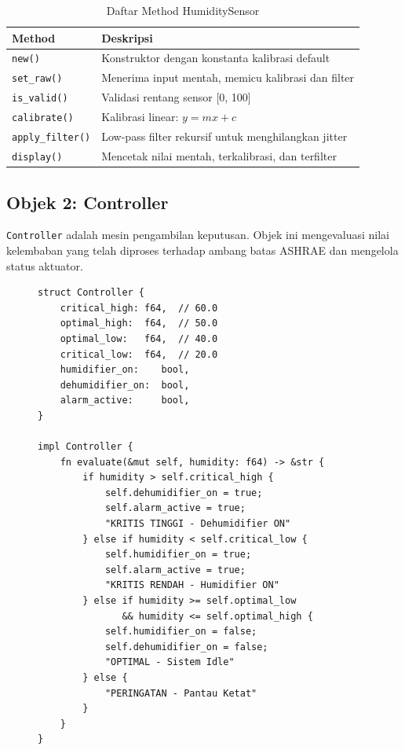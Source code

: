 \documentclass[journal]{IEEEtran}
\begin{document}
\begin{table}[H]
  \centering
  \caption{Daftar Method HumiditySensor}
  \begin{tabular}{@{}ll@{}}
    \toprule
    \textbf{Method} & \textbf{Deskripsi} \\
    \midrule
    \texttt{new()}           & Konstruktor dengan konstanta kalibrasi default \\
    \texttt{set\_raw()}      & Menerima input mentah, memicu kalibrasi dan filter \\
    \texttt{is\_valid()}     & Validasi rentang sensor [0, 100] \\
    \texttt{calibrate()}     & Kalibrasi linear: $y = mx + c$ \\
    \texttt{apply\_filter()} & Low-pass filter rekursif untuk menghilangkan jitter \\
    \texttt{display()}       & Mencetak nilai mentah, terkalibrasi, dan terfilter \\
    \bottomrule
  \end{tabular}
\end{table}

\subsection{Objek 2: Controller}
\texttt{Controller} adalah mesin pengambilan keputusan. Objek ini mengevaluasi nilai kelembaban yang telah diproses terhadap ambang batas ASHRAE dan mengelola status aktuator.

\begin{figure}[H]
\begin{lstlisting}[caption={Struct Controller dan Method Evaluate}]
struct Controller {
    critical_high: f64,  // 60.0
    optimal_high:  f64,  // 50.0
    optimal_low:   f64,  // 40.0
    critical_low:  f64,  // 20.0
    humidifier_on:    bool,
    dehumidifier_on:  bool,
    alarm_active:     bool,
}

impl Controller {
    fn evaluate(&mut self, humidity: f64) -> &str {
        if humidity > self.critical_high {
            self.dehumidifier_on = true;
            self.alarm_active = true;
            "KRITIS TINGGI - Dehumidifier ON"
        } else if humidity < self.critical_low {
            self.humidifier_on = true;
            self.alarm_active = true;
            "KRITIS RENDAH - Humidifier ON"
        } else if humidity >= self.optimal_low
               && humidity <= self.optimal_high {
            self.humidifier_on = false;
            self.dehumidifier_on = false;
            "OPTIMAL - Sistem Idle"
        } else {
            "PERINGATAN - Pantau Ketat"
        }
    }
}
\end{lstlisting}
\end{figure}
\end{document}
